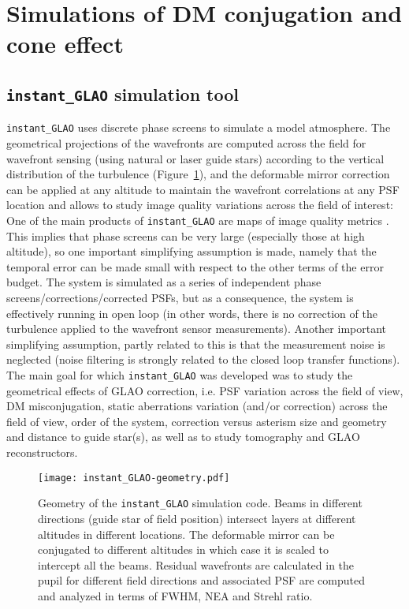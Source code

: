 \documentclass[aas_macros,10pt]{article}
\begin{document}
\section{Simulations of DM conjugation and cone effect
\label{chap:simul_2}}

\subsection{\texttt{instant\_GLAO} simulation tool}

\texttt{instant\_GLAO} uses discrete phase screens to simulate a model atmosphere.
The geometrical projections of the wavefronts are computed across the 
field for wavefront sensing (using natural or laser guide stars) according 
to the vertical distribution of the turbulence (Figure~\ref{fig:instant_GLAO-geometry}), 
and the deformable mirror correction can be applied at any altitude to 
maintain the wavefront correlations at any PSF location and allows to study 
image quality variations across the field of interest: One of the main products 
of \texttt{instant\_GLAO} are maps of image quality metrics \cite{Lai08, Lai10}. This implies that 
phase screens can be very large (especially those at high altitude), so 
one important simplifying assumption is made, namely that the temporal 
error can be made small with respect to the other terms of the error 
budget. The system is simulated as a series of independent phase 
screens/corrections/corrected PSFs, but as a consequence, the system 
is effectively running in open loop (in other words, there is no 
correction of the turbulence applied to the wavefront sensor 
measurements). Another important simplifying assumption, partly related 
to this is that the measurement noise is neglected (noise filtering is 
strongly related to the closed loop transfer functions). The main goal 
for which \texttt{instant\_GLAO} was developed was to study the geometrical 
effects of GLAO correction, i.e. PSF variation across the field of view, 
DM misconjugation, static aberrations variation (and/or correction) 
across the field of view, order of the system, correction versus 
asterism size and geometry and distance to guide star(s), as well 
as to study tomography and GLAO reconstructors.

\begin{figure}[ht]
\centering
\texttt{[image: instant\_GLAO-geometry.pdf]}
\caption{Geometry of the \texttt{instant\_GLAO} simulation code. Beams in different directions (guide star of field position) intersect layers at different altitudes in different locations. The deformable mirror can be conjugated to different altitudes in which case it is scaled to intercept all the beams. Residual wavefronts are calculated in the pupil for different field directions and associated PSF are computed and analyzed in terms of FWHM, NEA and Strehl ratio.}
\label{fig:instant_GLAO-geometry}
\end{figure}
\end{document}
